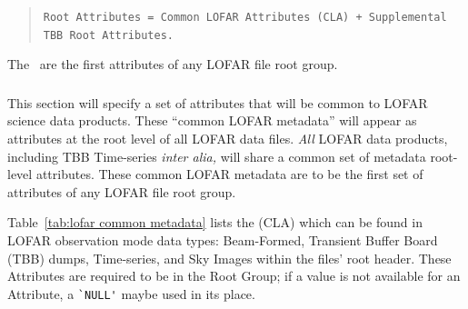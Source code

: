 \documentclass[a4paper,10pt,bibtotoc]{scrartcl}
\begin{document}
\begin{verse}
\verb|Root Attributes = Common LOFAR Attributes (CLA) + Supplemental TBB Root Attributes.|
\end{verse}

The \cla\ are the first attributes of any LOFAR file root group.

\subsubsection{\cla}
\label{sec:common lofar attributes}

This section will specify a set of attributes that will be common to
LOFAR science data products.  These ``common LOFAR metadata'' will
appear as attributes at the root level of all LOFAR data files.
\textit{All} LOFAR data products, including TBB Time-series
\textit{inter alia,} will share a common set of metadata root-level
attributes.  These common LOFAR metadata are to be the first set of
attributes of any LOFAR file root group.

Table~\ref{tab:lofar common metadata} lists the {\cla} (CLA) which can
be found in LOFAR observation mode data types: Beam-Formed, Transient
Buffer Board (TBB) dumps, Time-series, and Sky Images within the
files' root header. These Attributes are required to be in the Root
Group; if a value is not available for an Attribute, a \verb|`NULL'|
maybe used in its place.
\end{document}
